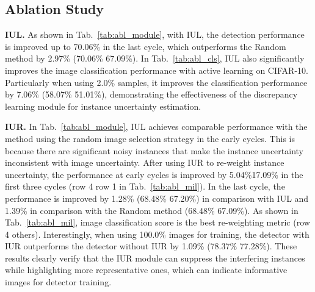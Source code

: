 \documentclass[final]{cvpr}
\begin{document}
\subsection{Ablation Study}

\textbf{IUL.} 
As shown in Tab.~\ref{tab:abl_module}, with IUL, the detection performance is improved up to 70.06\% in the last cycle, which outperforms the Random method by 2.97\% (70.06\%  67.09\%). In Tab.~\ref{tab:abl_cls}, IUL also significantly improves the image classification performance with active learning on CIFAR-10. Particularly when using 2.0\% samples, it improves the classification performance by 7.06\% (58.07\%  51.01\%), demonstrating the effectiveness of the discrepancy learning module for instance uncertainty estimation. 


\textbf{IUR.} In Tab.~\ref{tab:abl_module}, IUL achieves comparable performance with the method using the random image selection strategy in the early cycles. This is because there are significant noisy instances that make the instance uncertainty inconsistent with image uncertainty.
After using IUR to re-weight instance uncertainty, the performance at early cycles is improved by 5.04\%17.09\% in the first three cycles (row 4  row 1 in Tab.~\ref{tab:abl_mil}). 
In the last cycle, the performance is improved by 1.28\% (68.48\%  67.20\%) in comparison with IUL and 1.39\% in comparison with the Random method (68.48\%  67.09\%). As shown in Tab.~\ref{tab:abl_mil}, image classification score  is the best re-weighting metric (row 4  others).
Interestingly, when using 100.0\% images for training, the detector with IUR outperforms the detector without IUR by 1.09\% (78.37\%  77.28\%).
These results clearly verify that the IUR module can suppress the interfering instances while highlighting more representative ones, which can indicate informative images for detector training.
\end{document}
